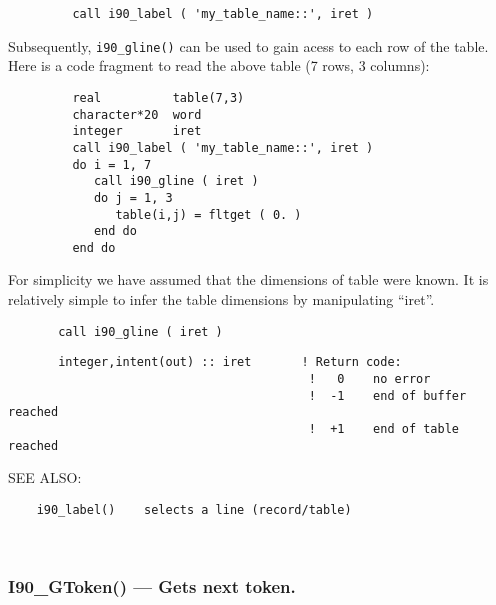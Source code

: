    \begin{verbatim}
         call i90_label ( 'my_table_name::', iret )
   \end{verbatim}
  
   Subsequently, {\tt i90\_gline()} can be used to gain acess to each
   row of the table. Here is a code fragment to read the above
   table (7 rows, 3 columns):
  
   \begin{verbatim}
         real          table(7,3)
         character*20  word
         integer       iret
         call i90_label ( 'my_table_name::', iret )
         do i = 1, 7
            call i90_gline ( iret )
            do j = 1, 3
               table(i,j) = fltget ( 0. )
            end do                   
         end do
   \end{verbatim}
  
    For simplicity we have assumed that the dimensions of table were
    known. It is relatively simple to infer the table dimensions
    by manipulating ``iret''.
  
\begin{verbatim}       call i90_gline ( iret )\end{verbatim}
\begin{verbatim}
       integer,intent(out) :: iret       ! Return code:
                                          !   0    no error
                                          !  -1    end of buffer reached
                                          !  +1    end of table  reached
 \end{verbatim}
{\sf SEE ALSO:}
\begin{verbatim}    i90_label()    selects a line (record/table)\end{verbatim}%
 
 
\mbox{}\hrulefill\ 

  \subsubsection{I90\_GToken() --- Gets next token. }

